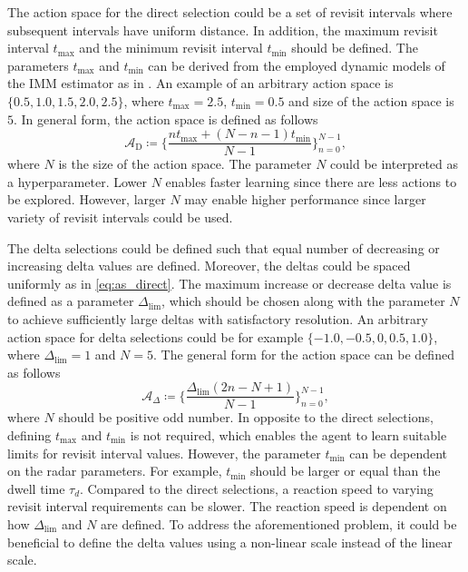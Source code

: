 \documentclass[english, 12pt, a4paper, elec, utf8, a-1b, online]{aaltothesis}
\newcommand{\As}{\mathcal{A}}
\newcommand{\tmax}{t_\text{max}}
\newcommand{\tmin}{t_\text{min}}
\newcommand{\deltalim}{\Delta_\text{lim}}
\begin{document}
The action space for the direct selection could be a set of revisit intervals where subsequent intervals have uniform distance.
In addition, the maximum revisit interval $\tmax$ and the minimum revisit interval $\tmin$ should be defined.
The parameters $\tmax$ and $\tmin$ can be derived from the employed dynamic models of the IMM estimator as in \cite{Benoudnine2006}.
An example of an arbitrary action space is $\{0.5, 1.0, 1.5, 2.0, 2.5\}$, where $\tmax=2.5$, $\tmin=0.5$ and size of the action space is $5$.
In general form, the action space is defined as follows
\begin{equation}\label{eq:as_direct}
    \As_\text{D} \coloneqq \{ \frac{n \tmax + (N-n-1) \tmin}{N-1} \}_{n=0}^{N-1},    
\end{equation}
where $N$ is the size of the action space.
The parameter $N$ could be interpreted as a hyperparameter.
Lower $N$ enables faster learning since there are less actions to be explored.
However, larger $N$ may enable higher performance since larger variety of revisit intervals could be used.

The delta selections could be defined such that equal number of decreasing or increasing delta values are defined.
Moreover, the deltas could be spaced uniformly as in \eqref{eq:as_direct}.
The maximum increase or decrease delta value is defined as a parameter $\deltalim$, which should be chosen along with the parameter $N$ to achieve sufficiently large deltas with satisfactory resolution.
An arbitrary action space for delta selections could be for example $\{ -1.0, -0.5, 0, 0.5, 1.0 \}$, where $\deltalim=1$ and $N=5$.
The general form for the action space can be defined as follows
\begin{equation}\label{eq:as_delta}
    \As_\Delta \coloneqq \{ \frac{\deltalim \left( 2 n - N + 1 \right)}{N-1} \}_{n=0}^{N-1},
\end{equation}
where $N$ should be positive odd number.
In opposite to the direct selections, defining $\tmax$ and $\tmin$ is not required, which enables the agent to learn suitable limits for revisit interval values.
However, the parameter $\tmin$ can be dependent on the radar parameters. 
For example, $\tmin$ should be larger or equal than the dwell time $\tau_d$.
Compared to the direct selections, a reaction speed to varying revisit interval requirements can be slower.
The reaction speed is dependent on how $\deltalim$ and $N$ are defined.
To address the aforementioned problem, it could be beneficial to define the delta values using a non-linear scale instead of the linear scale.
\end{document}

